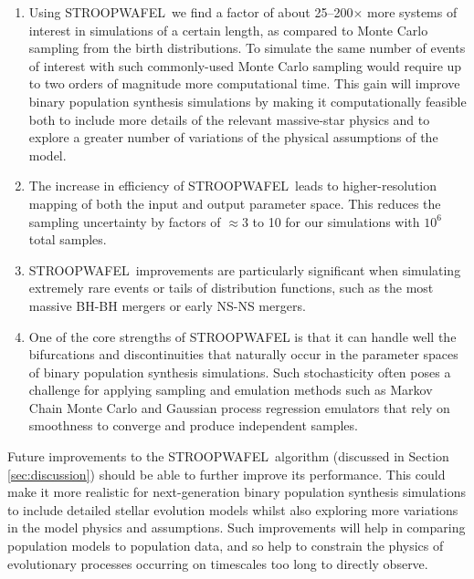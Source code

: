 \documentclass[a4paper,fleqn,usenatbib,useAMS,usedcolumn]{mnras}
\newcommand{\AISs}{\textsc{STROOPWAFEL}}
\begin{document}
\begin{enumerate}
	\item Using \AISs \ we find a factor of about 25--200$\times$ more systems of interest in simulations of a certain length, as compared to Monte Carlo sampling from the birth distributions. To simulate the same number of events of interest with such commonly-used Monte Carlo sampling would require up to two orders of magnitude more computational time.  This gain  will improve binary population synthesis simulations by making it computationally feasible both to include more details of the relevant massive-star physics and to explore a greater number of variations of the physical assumptions of the model.\\
	
	\item The increase in efficiency of \AISs \ leads to higher-resolution mapping of both the input and output parameter space. This reduces the sampling uncertainty by factors of $\approx 3$ to 10 for our simulations with $10^6$ total samples. \\
	
	\item \AISs \ improvements are particularly significant when simulating extremely rare events or tails of distribution functions, such as the most massive BH-BH mergers or early NS-NS mergers.  \\ 
	
\item One of the core strengths of  \AISs{} is that it can handle well the bifurcations and discontinuities that naturally occur in the parameter spaces of binary population synthesis simulations. Such stochasticity often poses a challenge for applying sampling and emulation methods such as Markov Chain Monte Carlo and Gaussian process regression emulators that rely on smoothness to converge and produce independent samples. \\

\end{enumerate}

Future improvements to the \AISs \ algorithm  (discussed in Section \ref{sec:discussion}) should be able to further improve its performance. This could make it more realistic for next-generation binary population synthesis simulations to include detailed stellar evolution models whilst also exploring more variations in the model physics and assumptions.    Such improvements will help in comparing population models to population data, and so help to constrain the physics of evolutionary processes occurring on timescales too long to directly observe.
\end{document}
